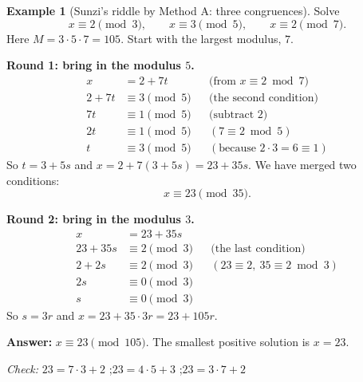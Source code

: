 \documentclass[11pt]{article}
\theoremstyle{definition}
\newtheorem{example}[theorem]{Example}
\theoremstyle{remark}
\begin{document}
\begin{example}[Sunzi's riddle by Method A: three congruences]\label{ex:qs-sunzi}
Solve
\[
x\equiv 2\pmod 3,\qquad x\equiv 3\pmod 5,\qquad x\equiv 2\pmod 7.
\]
Here $M=3\cdot5\cdot7=105$. Start with the largest modulus, $7$.

\textbf{Round 1: bring in the modulus $5$.}
\begin{align*}
x &= 2+7t &&\text{(from } x\equiv 2 \bmod 7)\\
2+7t &\equiv 3 \pmod 5 &&\text{(the second condition)}\\
7t &\equiv 1 \pmod 5 &&\text{(subtract 2)}\\
2t &\equiv 1 \pmod 5 &&(7\equiv 2 \bmod 5)\\
t &\equiv 3 \pmod 5 &&(\text{because } 2\cdot3=6\equiv1)
\end{align*}
So $t=3+5s$ and $x=2+7(3+5s)=23+35s$. We have merged two conditions:
\[
x\equiv 23\pmod{35}.
\]

\textbf{Round 2: bring in the modulus $3$.}
\begin{align*}
x &= 23+35s &&\\
23+35s &\equiv 2 \pmod 3 &&\text{(the last condition)}\\
2+2s &\equiv 2 \pmod 3 &&(23\equiv 2,\ 35\equiv 2 \bmod 3)\\
2s &\equiv 0 \pmod 3 &&\\
s &\equiv 0 \pmod 3 &&
\end{align*}
So $s=3r$ and $x=23+35\cdot3r=23+105r$.

\textbf{Answer:} $x\equiv 23\pmod{105}$. The smallest positive solution is $x=23$.

\emph{Check:} $23=7\cdot3+2$ \checkmark;\quad $23=4\cdot5+3$ \checkmark;\quad $23=3\cdot7+2$ \checkmark
\end{example}
\end{document}

